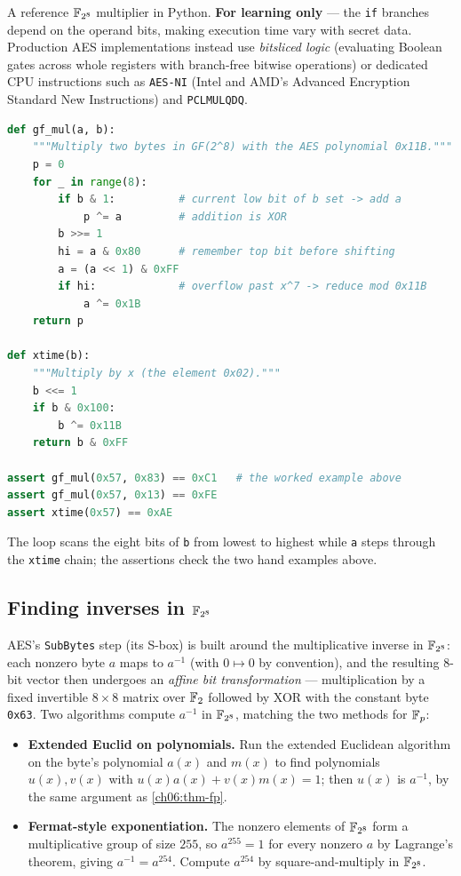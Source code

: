 \begin{implementbox}
A reference $\mathbb{F}_{2^8}$ multiplier in Python. \textbf{For learning only} --- the
\texttt{if} branches depend on the operand bits, making execution time vary
with secret data. Production AES implementations instead use \emph{bitsliced
logic} (evaluating Boolean gates across whole registers with branch-free
bitwise operations) or dedicated CPU instructions such as \texttt{AES-NI}
(Intel and AMD's Advanced Encryption Standard New Instructions) and
\texttt{PCLMULQDQ}.
\begin{lstlisting}[language=Python]
def gf_mul(a, b):
    """Multiply two bytes in GF(2^8) with the AES polynomial 0x11B."""
    p = 0
    for _ in range(8):
        if b & 1:          # current low bit of b set -> add a
            p ^= a         # addition is XOR
        b >>= 1
        hi = a & 0x80      # remember top bit before shifting
        a = (a << 1) & 0xFF
        if hi:             # overflow past x^7 -> reduce mod 0x11B
            a ^= 0x1B
    return p

def xtime(b):
    """Multiply by x (the element 0x02)."""
    b <<= 1
    if b & 0x100:
        b ^= 0x11B
    return b & 0xFF

assert gf_mul(0x57, 0x83) == 0xC1   # the worked example above
assert gf_mul(0x57, 0x13) == 0xFE
assert xtime(0x57) == 0xAE
\end{lstlisting}
The loop scans the eight bits of \texttt{b} from lowest to highest while
\texttt{a} steps through the \texttt{xtime} chain; the assertions check the two
hand examples above.
\end{implementbox}

\subsection{Finding inverses in $\mathbb{F}_{2^8}$}

AES's \texttt{SubBytes} step (its S-box) is built around the multiplicative
inverse in $\mathbb{F}_{2^8}$: each nonzero byte $a$ maps to $a^{-1}$ (with $0 \mapsto
0$ by convention), and the resulting $8$-bit vector then undergoes an
\emph{affine bit transformation} --- multiplication by a fixed invertible
$8\times 8$ matrix over $\mathbb{F}_2$ followed by XOR with the constant byte
\texttt{0x63}. Two algorithms compute $a^{-1}$ in $\mathbb{F}_{2^8}$, matching the two
methods for $\mathbb{F}_p$:

\begin{itemize}
  \item \textbf{Extended Euclid on polynomials.} Run the extended Euclidean
        algorithm on the byte's polynomial $a(x)$ and $m(x)$ to find
        polynomials $u(x), v(x)$ with $u(x)a(x) + v(x)m(x) = 1$; then $u(x)$ is
        $a^{-1}$, by the same argument as \autoref{ch06:thm-fp}.
  \item \textbf{Fermat-style exponentiation.} The nonzero elements of
        $\mathbb{F}_{2^8}$ form a multiplicative group of size $255$, so $a^{255} = 1$
        for every nonzero $a$ by Lagrange's theorem, giving $a^{-1} = a^{254}$.
        Compute $a^{254}$ by square-and-multiply in $\mathbb{F}_{2^8}$.
\end{itemize}

